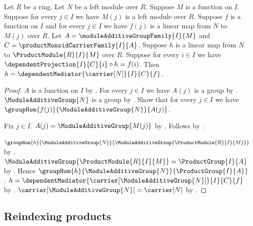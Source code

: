 \begin{theorem}\label{product_module_mediator_unique}
    Let $R$ be a ring.
    Let $N$ be a left module over $R$.
    Suppose $M$ is a function on $I$.
    Suppose for every $j\in I$ we have $M(j)$ is a left module over $R$.
    Suppose $f$ is a function on $I$ and for every $j\in I$ we have
        $f(j)$ is a linear map from $N$ to $M(j)$ over $R$.
    Let $A=\moduleAdditiveGroupFamily{I}{M}$ and
        $C=\productMonoidCarrierFamily{I}{A}$.
    Suppose $h$ is a linear map from $N$ to
        $\ProductModule{R}{I}{M}$ over $R$.
    Suppose for every $i\in I$ we have
        $\dependentProjection{I}{C}{i}\circ h=f(i)$.
    Then $h=\dependentMediator{\carrier[N]}{I}{C}{f}$.
\end{theorem}
\begin{proof}
    $A$ is a function on $I$ by
        .
    For every $j\in I$ we have $A(j)$ is a group by
        .
    $\ModuleAdditiveGroup{N}$ is a group by
        .
    Show that for every $j\in I$ we have
        $\groupHom{f(j)}{\ModuleAdditiveGroup{N}}{A(j)}$.
    \begin{subproof}
        Fix $j\in I$.
        $A(j)=\ModuleAdditiveGroup{M(j)}$ by
            .
        Follows by .
    \end{subproof}
    $\groupHom{h}{\ModuleAdditiveGroup{N}}{
        \ModuleAdditiveGroup{\ProductModule{R}{I}{M}}}$ by
        .
    $\ModuleAdditiveGroup{\ProductModule{R}{I}{M}}
        =\ProductGroup{I}{A}$ by
        .
    Hence $\groupHom{h}{\ModuleAdditiveGroup{N}}{
        \ProductGroup{I}{A}}$.
    $h=\dependentMediator{\carrier[\ModuleAdditiveGroup{N}]}{I}{C}{f}$
        by .
    $\carrier[\ModuleAdditiveGroup{N}]=\carrier[N]$ by
        .
\end{proof}

\subsection{Reindexing products}

